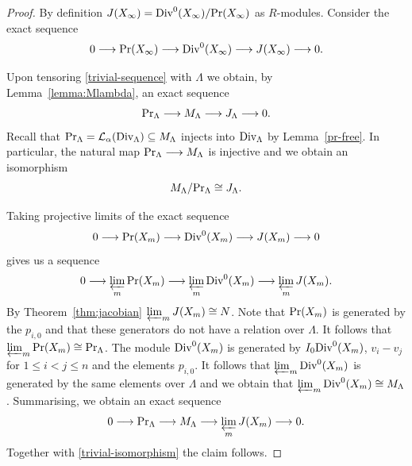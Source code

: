 \begin{proof}
	By definition $J(X_\infty)=\textup{Div}^0(X_\infty)/\textup{Pr}(X_\infty)$ as $R$-modules. Consider the exact sequence
	\begin{equation}\label{trivial-sequence}0\longrightarrow \textup{Pr}(X_\infty)\longrightarrow \textup{Div}^0(X_\infty)\longrightarrow J(X_\infty)\longrightarrow 0.\end{equation}
	
	
	Upon tensoring \eqref{trivial-sequence} with $\Lambda$ we obtain, by Lemma~\ref{lemma:Mlambda}, an exact sequence
	\[\textup{Pr}_\Lambda\longrightarrow M_\Lambda\longrightarrow J_\Lambda \longrightarrow 0.\]
	Recall that $\textup{Pr}_\Lambda=\mathcal{L}_\alpha(\textup{Div}_\Lambda)\subseteq M_\Lambda$ injects into $\textup{Div}_ \Lambda$ by Lemma~\ref{pr-free}. In particular, the natural map $\textup{Pr}_\Lambda\longrightarrow M_\Lambda$ is injective and we obtain an isomorphism
	\begin{equation}
		\label{trivial-isomorphism}
		M_\Lambda/\textup{Pr}_\Lambda \cong J_\Lambda.
	\end{equation}
	
	Taking projective limits of the exact sequence
	\[0\longrightarrow \textup{Pr}(X_m)\longrightarrow \textup{Div}^0(X_m)\longrightarrow J(X_m)\longrightarrow 0\] gives us a sequence
	\[0\longrightarrow \varprojlim_m\textup{Pr}(X_m)\longrightarrow \varprojlim_m\textup{Div}^0(X_m)\longrightarrow \varprojlim_mJ(X_m).\]
	By Theorem~\ref{thm:jacobian} $\varprojlim_mJ(X_m)\cong N$. Note that $\textup{Pr}(X_m)$ is generated by the $p_{i,0}$ and that these generators do not have a relation over $\Lambda$. It follows that $\varprojlim_m\textup{Pr}(X_m)\cong \textup{Pr}_\Lambda$. The module $\textup{Div}^0(X_m)$ is generated by $I_0\textup{Div}^0(X_m)$, $v_i-v_{j}$ for $1\le i<j\le n$ and the elements $p_{i,0}$. It follows that $\varprojlim_m\textup{Div}^0(X_m)$ is generated by the same elements over $\Lambda$ and we obtain that $\varprojlim_m\textup{Div}^0(X_m)\cong M_\Lambda$. Summarising, we obtain an exact sequence
	\[0\longrightarrow \textup{Pr}_\Lambda\longrightarrow M_\Lambda\longrightarrow \varprojlim_mJ(X_m)\longrightarrow 0. \]
	Together with \eqref{trivial-isomorphism} the claim follows.
\end{proof}



